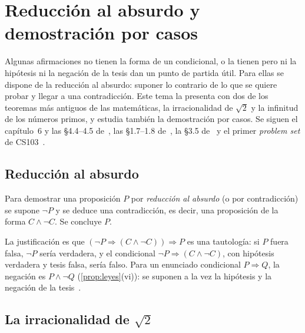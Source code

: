 \chapter{Reducción al absurdo y demostración por casos}
\label{tema:4}

Algunas afirmaciones no tienen la forma de un condicional, o la tienen pero ni la hipótesis ni la negación de la tesis dan un punto de partida útil. Para ellas se dispone de la reducción al absurdo: suponer lo contrario de lo que se quiere probar y llegar a una contradicción. Este tema la presenta con dos de los teoremas más antiguos de las matemáticas, la irracionalidad de $\sqrt2$ y la infinitud de los números primos, y estudia también la demostración por casos. Se siguen el capítulo~6 y las §4.4–4.5 de~\cite{hammack}, las §1.7–1.8 de~\cite{mcs}, la §3.5 de~\cite{velleman} y el primer \emph{problem set} de CS103~\cite{cs103}.

\section{Reducción al absurdo}

\begin{definicion}\label{def:absurdo}
Para demostrar una proposición $P$ por \emph{reducción al absurdo} (o por contradicción) se supone $\neg P$ y se deduce una contradicción, es decir, una proposición de la forma $C\wedge\neg C$. Se concluye $P$.
\end{definicion}

La justificación es que $(\neg P\Rightarrow(C\wedge\neg C))\Rightarrow P$ es una tautología: si $P$ fuera falsa, $\neg P$ sería verdadera, y el condicional $\neg P\Rightarrow(C\wedge\neg C)$, con hipótesis verdadera y tesis falsa, sería falso. Para un enunciado condicional $P\Rightarrow Q$, la negación es $P\wedge\neg Q$ (\cref{prop:leyes}(vi)): se suponen a la vez la hipótesis y la negación de la tesis~\cite[§6.2]{hammack}.

\addtocounter{definicion}{1}%

\addtocounter{definicion}{1}%

\section{La irracionalidad de \texorpdfstring{$\sqrt2$}{raíz de 2}}


